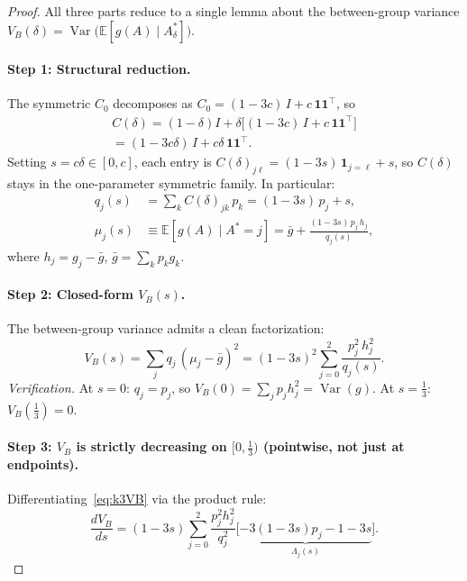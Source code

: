 
\begin{proof}
All three parts reduce to a single lemma about the between-group variance
$V_B(\delta)=\operatorname{Var}\bigl(\mathbb{E}[g(A)\mid A^*_\delta]\bigr)$.

\paragraph{Step 1: Structural reduction.}
The symmetric $C_0$ decomposes as $C_0=(1{-}3c)\,I+c\,\mathbf{1}\mathbf{1}^\top$, so
\begin{multline*}
  C(\delta) = (1{-}\delta)I + \delta\bigl[(1{-}3c)\,I+c\,\mathbf{1}\mathbf{1}^\top\bigr]\\
  = (1{-}3c\delta)\,I + c\delta\,\mathbf{1}\mathbf{1}^\top.
\end{multline*}
Setting $s=c\delta\in[0,c]$, each entry is
$C(\delta)_{j\ell}=(1{-}3s)\,\mathbf{1}_{j=\ell}+s$,
so $C(\delta)$ stays in the one-parameter symmetric family.
In particular:
\begin{align}
  q_j(s) &= \textstyle\sum_k C(\delta)_{jk}\,p_k = (1{-}3s)\,p_j + s, \label{eq:k3q} \\
  \mu_j(s) &\equiv \mathbb{E}[g(A)\mid A^*{=}j]
  = \bar{g} + \frac{(1{-}3s)\,p_j\,h_j}{q_j(s)}, \label{eq:k3mu}
\end{align}
where $h_j=g_j-\bar{g}$, $\bar{g}=\sum_k p_k g_k$.

\paragraph{Step 2: Closed-form $V_B(s)$.}
The between-group variance admits a clean factorization:
\begin{equation}
  V_B(s) = \sum_j q_j\,(\mu_j-\bar{g})^2
  = (1{-}3s)^2\sum_{j=0}^{2}\frac{p_j^2\,h_j^2}{q_j(s)}.
  \label{eq:k3VB}
\end{equation}
\emph{Verification.}
At $s{=}0$: $q_j{=}p_j$, so $V_B(0)=\sum_j p_j h_j^2=\operatorname{Var}(g)$.
At $s{=}\tfrac{1}{3}$: $V_B(\tfrac{1}{3})=0$.

\paragraph{Step 3: $V_B$ is strictly decreasing on $[0,\tfrac{1}{3})$ (pointwise, not just at endpoints).}
Differentiating~\eqref{eq:k3VB} via the product rule:
\begin{equation}
  \frac{dV_B}{ds}
  = (1{-}3s)\!\sum_{j=0}^{2}\!\frac{p_j^2 h_j^2}{q_j^2}\!\bigl[\underbrace{-3(1{-}3s)p_j\!-\!1\!-\!3s}_{\Lambda_j(s)}\bigr].
  \label{eq:k3dVB}
\end{equation}


\end{proof}
